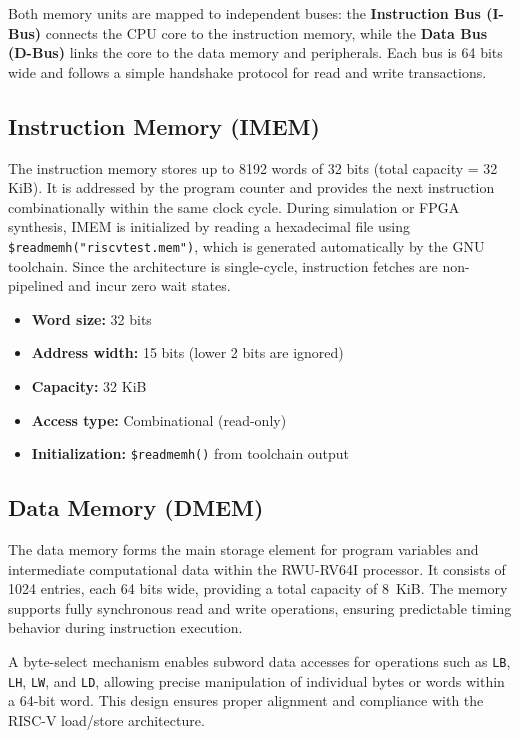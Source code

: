 Both memory units are mapped to independent buses:
the \textbf{Instruction Bus (I-Bus)} connects the CPU core to the instruction memory,
while the \textbf{Data Bus (D-Bus)} links the core to the data memory and peripherals.
Each bus is 64 bits wide and follows a simple handshake protocol for read and write transactions.

\subsection{Instruction Memory (IMEM)}
The instruction memory stores up to 8192 words of 32 bits (total capacity = 32 KiB).  
It is addressed by the program counter and provides the next instruction combinationally within the same clock cycle.  
During simulation or FPGA synthesis, IMEM is initialized by reading a hexadecimal file using
\texttt{\$readmemh("riscvtest.mem")}, which is generated automatically by the GNU toolchain.  
Since the architecture is single-cycle, instruction fetches are non-pipelined and incur zero wait states.

\begin{itemize}
  \item \textbf{Word size:} 32 bits  
  \item \textbf{Address width:} 15 bits (lower 2 bits are ignored)  
  \item \textbf{Capacity:} 32 KiB  
  \item \textbf{Access type:} Combinational (read-only)  
  \item \textbf{Initialization:} \texttt{\$readmemh()} from toolchain output
\end{itemize}

\subsection{Data Memory (DMEM)}
The data memory forms the main storage element for program variables and intermediate computational data within the RWU-RV64I processor.  
It consists of 1024 entries, each 64 bits wide, providing a total capacity of 8~KiB. The memory supports fully synchronous read and write operations, ensuring predictable timing behavior during instruction execution.

A byte-select mechanism enables subword data accesses for operations such as \texttt{LB}, \texttt{LH}, \texttt{LW}, and \texttt{LD}, allowing precise manipulation of individual bytes or words within a 64-bit word.  
This design ensures proper alignment and compliance with the RISC-V load/store architecture.

